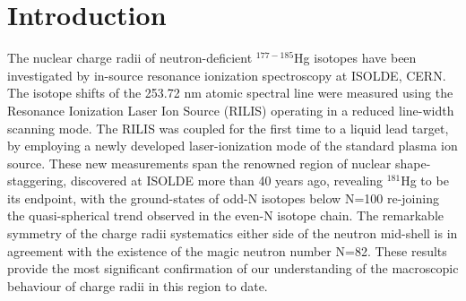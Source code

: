 \section{Introduction}
The nuclear charge radii of neutron-deficient $^{177-185}$Hg isotopes have been investigated by in-source resonance ionization spectroscopy at ISOLDE, CERN.  The isotope shifts of the 253.72 nm atomic spectral line were measured using the Resonance Ionization Laser Ion Source (RILIS) operating in a reduced line-width scanning mode.  The RILIS was coupled for the first time to a liquid lead target, by employing a newly developed laser-ionization mode of the standard plasma ion source. These new measurements span the renowned region of nuclear shape-staggering, discovered at ISOLDE more than 40 years ago, revealing $^{181}$Hg to be its endpoint, with the ground-states of odd-N isotopes below N=100 re-joining the quasi-spherical trend observed in the even-N isotope chain.  The remarkable symmetry of the charge radii systematics either side of the neutron mid-shell is in agreement with the existence of the magic neutron number N=82.
These results provide the most significant confirmation of our understanding of the macroscopic behaviour of charge radii in this region to date.